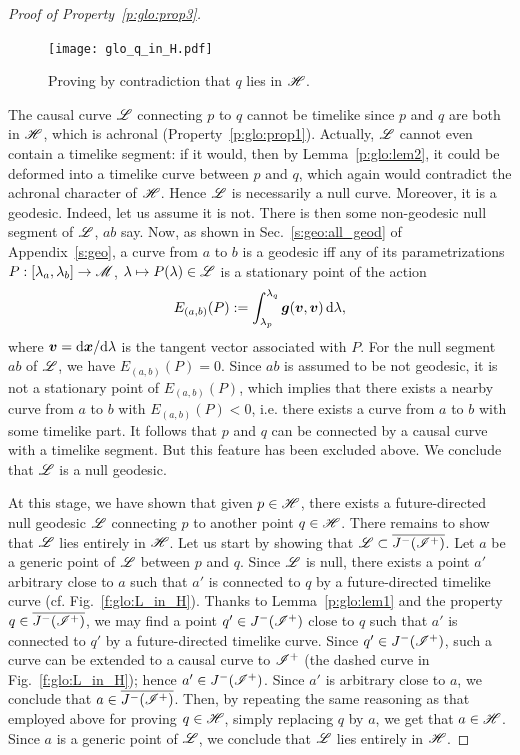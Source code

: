 \begin{proof}[Proof of Property~\ref{p:glo:prop3}]
\begin{figure}
\centerline{\texttt{[image: glo\_q\_in\_H.pdf]}}
\caption[]{\label{f:glo:q_in_H} \footnotesize
Proving by contradiction that $q$ lies in $\mathscr{H}$.}
\end{figure}


The causal curve $\mathscr{L}$ connecting $p$ to $q$ cannot be timelike since
$p$ and $q$ are both in $\mathscr{H}$, which is achronal (Property~\ref{p:glo:prop1}).
Actually, $\mathscr{L}$ cannot even contain a timelike segment: if it would, then
by Lemma~\ref{p:glo:lem2}, it could
be deformed into a timelike curve between $p$ and $q$, which again would
contradict the achronal character of $\mathscr{H}$. Hence $\mathscr{L}$ is necessarily a null
curve. Moreover, it is a geodesic. Indeed, let us assume it is not.
There is then some non-geodesic null segment of $\mathscr{L}$, $ab$ say. Now, as shown in Sec.~\ref{s:geo:all_geod} of Appendix~\ref{s:geo},
a curve from $a$ to $b$ is a geodesic iff any of its parametrizations
$P: [\lambda_a,\lambda_b] \rightarrow \mathscr{M}$, $\lambda \mapsto P(\lambda)\in\mathscr{L}$
is a stationary point of the action
\[
    E_{(a,b)}(P) := \int_{\lambda_p}^{\lambda_q}
        \bm{g}(\bm{v}, \bm{v})  \, \mathrm{d}\lambda ,
\]
where $\bm{v} = \mathrm{d}\bm{x}/\mathrm{d}\lambda$ is the tangent vector
associated with $P$. For the null segment $ab$ of $\mathscr{L}$, we have
$E_{(a,b)}(P)=0$. Since $ab$ is assumed to be not geodesic, it is not a
stationary point of $E_{(a,b)}(P)$, which
implies that there exists a nearby curve from $a$ to $b$ with $E_{(a,b)}(P)<0$,
i.e. there exists a curve from $a$ to $b$ with some timelike part.
It follows that $p$ and $q$ can be connected
by a causal curve with a timelike segment. But this feature has been
excluded above. We conclude that $\mathscr{L}$ is a null geodesic.

At this stage, we have shown that given $p\in\mathscr{H}$, there exists
a future-directed null geodesic $\mathscr{L}$ connecting $p$ to another point $q\in\mathscr{H}$.
There remains to show that $\mathscr{L}$ lies entirely in $\mathscr{H}$.
Let us start by showing that $\mathscr{L}\subset \overline{J^-(\mathscr{I}^+)}$.
Let $a$ be a generic point of $\mathscr{L}$ between $p$ and $q$. Since $\mathscr{L}$ is
null, there exists a point
$a'$ arbitrary close to $a$ such that $a'$ is connected to $q$ by a
future-directed timelike curve (cf. Fig.~\ref{f:glo:L_in_H}). Thanks to Lemma~\ref{p:glo:lem1}
and the property $q\in \overline{J^-(\mathscr{I}^+)}$, we may
find a point $q'\in J^-(\mathscr{I}^+)$ close to $q$ such that $a'$ is connected
to $q'$ by a future-directed timelike curve.
Since $q'\in J^-(\mathscr{I}^+)$, such a curve can be extended
to a causal curve to $\mathscr{I}^+$  (the dashed curve
in Fig.~\ref{f:glo:L_in_H}); hence
$a'\in  J^-(\mathscr{I}^+)$. Since $a'$ is arbitrary close to $a$, we conclude
that $a\in\overline{J^-(\mathscr{I}^+)}$.
Then, by repeating the same reasoning as that employed above for proving
$q\in\mathscr{H}$, simply replacing $q$ by $a$, we get that $a\in\mathscr{H}$. Since
$a$ is a generic point of $\mathscr{L}$, we conclude that
$\mathscr{L}$ lies entirely in $\mathscr{H}$.


\end{proof}
